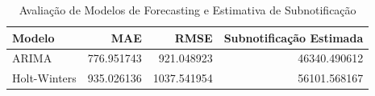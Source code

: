 \begin{table}
\caption{Avaliação de Modelos de Forecasting e Estimativa de Subnotificação}
\label{tab:metricas_ts}
\begin{tabular}{lrrr}
\toprule
Modelo & MAE & RMSE & Subnotificação Estimada \\
\midrule
ARIMA & 776.951743 & 921.048923 & 46340.490612 \\
Holt-Winters & 935.026136 & 1037.541954 & 56101.568167 \\
\bottomrule
\end{tabular}
\end{table}
